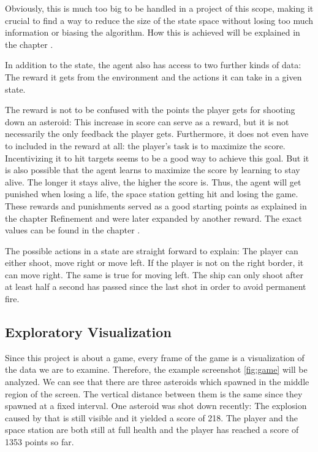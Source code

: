 \documentclass[a4paper,10pt]{article}
\begin{document}
Obviously, this is much too big to be handled in a project of this scope, making it crucial to find a way to reduce the size of the state space without losing too much information or biasing the algorithm.
How this is achieved will be explained in the chapter .

In addition to the state, the agent also has access to two further kinds of data: The reward it gets from the environment and the actions it can take in a given state.

The reward is not to be confused with the points the player gets for shooting down an asteroid: This increase in score can serve as a reward, but it is not necessarily the only feedback the player gets.
Furthermore, it does not even have to included in the reward at all: the player's task is to maximize the score.
Incentivizing it to hit targets seems to be a good way to achieve this goal.
But it is also possible that the agent learns to maximize the score by learning to stay alive.
The longer it stays alive, the higher the score is. 
Thus, the agent will get punished when losing a life, the space station getting hit and losing the game. 
These rewards and punishments served as a good starting points as explained in the chapter Refinement and were later expanded by another reward.
The exact values can be found in the chapter .

The possible actions in a state are straight forward to explain: The player can either shoot, move right or move left.
If the player is not on the right border, it can move right.
The same is true for moving left.
The ship can only shoot after at least half a second has passed since the last shot in order to avoid permanent fire. 


\subsection{Exploratory Visualization}

Since this project is about a game, every frame of the game is a visualization of the data we are to examine.
Therefore, the example screenshot \ref{fig:game} will be analyzed.
We can see that there are three asteroids which spawned in the middle region of the screen.
The vertical distance between them is the same since they spawned at a fixed interval.
One asteroid was shot down recently: The explosion caused by that is still visible and it yielded a score of 218.
The player and the space station are both still at full health and the player has reached a score of 1353 points so far.
\end{document}
